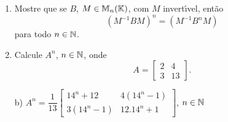 \documentclass[12pt]{exam}
\begin{document}
\begin{exercicio}
  \begin{enumerate}[label=({\alph*})]
    \item Mostre que se $B$, $M \in \mathbb{M}_n(\mathbb{K})$, com $M$ invert{\'\i}vel, ent\~ao
    \[
        (M^{-1}BM)^n = (M^{-1}B^nM)
    \]
    para todo $n \in \mathbb{N}$.
    \item Calcule $A^n$, $n \in \mathbb{N}$, onde
    \[
      A = \begin{bmatrix}
        2 & 4\\
        3 & 13
      \end{bmatrix}.
    \]
  \end{enumerate}
  \begin{solucao}
    \begin{enumerate}
    \item[b)] $A^n = \dfrac{1}{13}\begin{bmatrix}
      14^n + 12 & 4(14^n - 1)\\3(14^n - 1) & 12.14^n + 1
    \end{bmatrix}$, $n \in \mathbb{N}$
  \end{enumerate}
  \end{solucao}
\end{exercicio}
\end{document}

